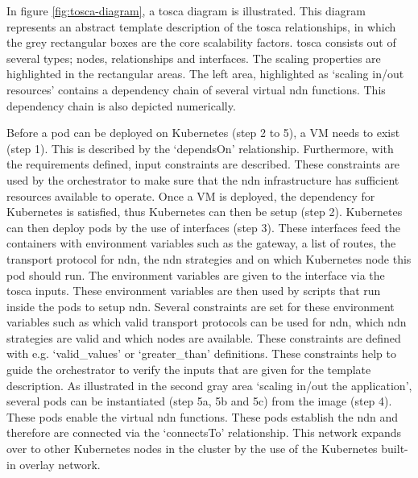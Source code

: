 \documentclass[conference]{IEEEtran}
\begin{document}
In figure \ref{fig:tosca-diagram}, a \gls{tosca} diagram is illustrated. This diagram represents an abstract template description of the \gls{tosca} relationships, in which the grey rectangular boxes are the core scalability factors. \gls{tosca} consists out of several types; nodes, relationships and interfaces. The scaling properties are highlighted in the rectangular areas. The left area, highlighted as `scaling in/out resources' contains a dependency chain of several virtual \gls{ndn} functions. This dependency chain is also depicted numerically.

Before a pod can be deployed on Kubernetes (step 2 to 5), a VM needs to exist (step 1). This is described by the `dependsOn' relationship. Furthermore, with the requirements defined, input constraints are described. These constraints are used by the orchestrator to make sure that the \gls{ndn} infrastructure has sufficient resources available to operate. Once a VM is deployed, the dependency for Kubernetes is satisfied, thus Kubernetes can then be setup (step 2). Kubernetes can then deploy pods by the use of interfaces (step 3). These interfaces feed the containers with environment variables such as the gateway, a list of routes, the transport protocol for \gls{ndn}, the \gls{ndn} strategies and on which Kubernetes node this pod should run. The environment variables are given to the interface via the \gls{tosca} inputs. These environment variables are then used by scripts that run inside the pods to setup \gls{ndn}. Several constraints are set for these environment variables such as which valid transport protocols can be used for \gls{ndn}, which \gls{ndn} strategies are valid and which nodes are available. These constraints are defined with e.g. `valid\_values' or `greater\_than' definitions. These constraints help to guide the orchestrator to verify the inputs that are given for the template description. As illustrated in the second gray area `scaling in/out the application', several pods can be instantiated (step 5a, 5b and 5c) from the image (step 4). These pods enable the virtual \gls{ndn} functions. These pods establish the \gls{ndn} and therefore are connected via the `connectsTo' relationship. This network expands over to other Kubernetes nodes in the cluster by the use of the Kubernetes built-in overlay network.
\end{document}
